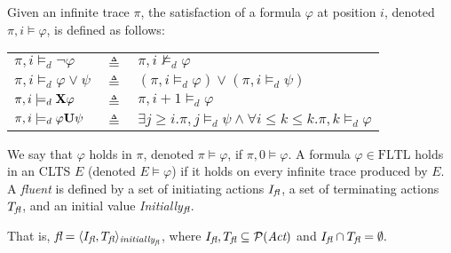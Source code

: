 Given an infinite trace $\pi$, the satisfaction of a formula $\varphi$ at position $i$, denoted $\pi,i\models\varphi$, is defined as follows:

\begin{tabular}{ l c l }
$\pi, i \models_d \neg \varphi$ & $\triangleq$ & $\pi, i \not\models_d \varphi$\\
$\pi, i \models_d \varphi \vee \psi$ & $\triangleq$ & $(\pi, i \models_d \varphi) \vee (\pi, i \models_d \psi)$\\
$\pi, i \models_d {\bf X} \varphi$ & $\triangleq$ & $\pi, i +1 \models_d \varphi$\\
$\pi, i \models_d \varphi {\bf U} \psi$ & $\triangleq$ & $\exists j \geq i . \pi,j \models_d \psi \wedge \forall i \leq k \le k. \pi, k \models_d \varphi$\\
\end{tabular}
  
We say that $\varphi$ holds in $\pi$, denoted $\pi\models\varphi$, if $\pi,0\models\varphi$. 
A formula $\varphi \in \mbox{FLTL}$ holds in an CLTS $E$ (denoted $E \models \varphi$) if it holds on every infinite trace produced by $E$.
A \emph{fluent} \fluent \space is defined by a set of initiating actions $I_{\emph{fl}}$, a set of terminating actions $T_{\emph{fl}}$, and an initial value \emph{Initially}$_{\emph{fl}}$.

That is,
$ \emph{fl} = \langle I_{\emph{fl}}, T_{\emph{fl}} \rangle_{\emph{initially}_{\emph{fl}}} $, 
where 
$I_{\emph{fl}},T_{\emph{fl}} \subseteq \mathcal{P}(\emph{Act})$ 
and $I_{\emph{fl}} \cap T_{\emph{fl}} = \emptyset.$\\
